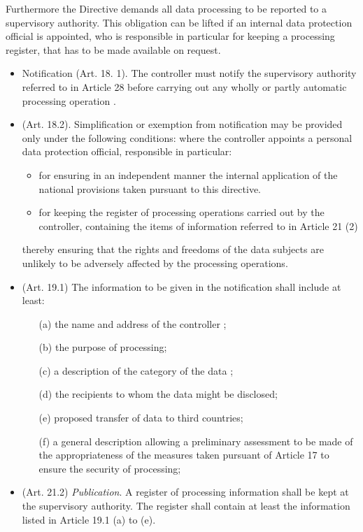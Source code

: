 Furthermore the Directive demands all data processing to be reported to a supervisory authority.
This obligation can be lifted if an internal data protection official is appointed, who is responsible in particular for keeping a processing register, that has to be made available on request.

\begin{itemize}
\item Notification (Art. 18. 1).
The controller \om must notify the supervisory authority referred to in Article 28 before carrying out any wholly or partly automatic processing operation \om.

\item (Art. 18.2).
Simplification or exemption from notification may be provided only under the following conditions: \om where the controller \om appoints a personal data protection official, responsible in particular:
\begin{itemize}
\item for ensuring in an independent manner the internal application of the national provisions taken pursuant to this directive.
\item for keeping the register of processing operations carried out by the controller, containing the items of information referred to in Article 21 (2)
\end{itemize}
thereby ensuring that the rights and freedoms of the data subjects are unlikely to be adversely affected by the processing operations.

\item (Art. 19.1)
The information to be given in the notification shall include at least:
\begin{itemize}
  \item [(a)] the name and address of the controller \om;
  \item [(b)] the purpose \om of processing;
  \item [(c)] a description of the category \om of the data \om;
  \item [(d)] the recipients \om to whom the data might be disclosed;
  \item [(e)] proposed transfer of data to third countries;
  \item [(f)] a general description allowing a preliminary assessment to be made of the appropriateness of the measures taken pursuant of Article 17 to ensure the security of processing;
\end{itemize}

\item (Art. 21.2) \emph{Publication}.
A register of processing information \om shall be kept at the supervisory authority.
The register shall contain at least the information listed in Article 19.1 (a) to (e).


\end{itemize}
